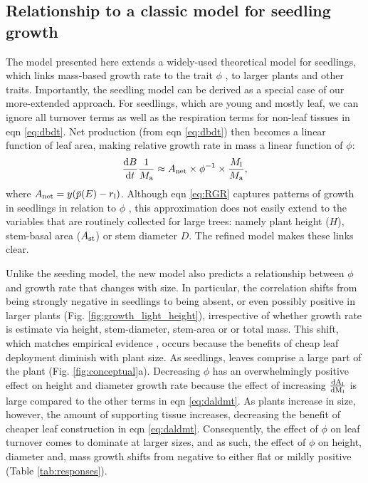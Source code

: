 \documentclass[a4paper,11pt]{article}
\begin{document}


\subsection{Relationship to a classic model for seedling growth}

The model presented here extends a widely-used theoretical model for seedlings, which links mass-based growth rate to the trait $\phi$ \citep{Lambers-1992, Wright-2000}, to larger plants and other traits. Importantly, the seedling model can be derived as a special case of our more-extended approach. For seedlings, which are young and mostly leaf, we can ignore all turnover terms as well as the respiration terms for non-leaf tissues in eqn \ref{eq:dbdt}. Net production (from eqn \ref{eq:dbdt}) then becomes a linear function of leaf area, making relative growth rate in mass a linear function of $\phi$:
\begin{equation}\label{eq:RGR}
\frac{{\rm d}B}{{\rm d}t}\frac{1}{M_{\rm a}}  \approx A_\textrm{net} \times \phi^{-1} \times \frac{M_{\rm l}}{M_{\rm a}}, \end{equation}
where $A_\textrm{net} = y(\bar{p}(E) - r_{\rm l})$. Although eqn \ref{eq:RGR} captures patterns of growth in seedlings in relation to $\phi$ \citep{Wright-2000}, this approximation does not easily extend to the variables that are routinely collected for large trees: namely plant height ($H$), stem-basal area ($A_{\rm st}$) or stem diameter $D$. The refined model makes these links clear.

Unlike the seeding model, the new model also predicts a relationship between $\phi$ and growth rate that changes with size. In particular, the correlation shifts from being strongly negative in seedlings to being absent, or even possibly positive in larger plants (Fig. \ref{fig:growth_light_height}), irrespective of whether growth rate is estimate via height, stem-diameter, stem-area or or total mass. This shift, which matches empirical evidence \citep{Poorter-2008, Wright-2010, Herault-2011, Paine-2015, Gibert-2016}, occurs because the benefits of cheap leaf deployment diminish with plant size. As seedlings, leaves comprise a large part of the plant (Fig. \ref{fig:conceptual}a). Decreasing $\phi$ has an overwhelmingly positive effect on height and diameter growth rate because the effect of increasing $\frac{\rm{d} A_{\rm l}}{\rm{d} M_{\rm l}}$ is large compared to the other terms in eqn \ref{eq:daldmt}. As plants increase in size, however, the amount of supporting tissue increases, decreasing the benefit of cheaper leaf construction in eqn \ref{eq:daldmt}. Consequently, the effect of $\phi$ on leaf turnover comes to dominate at larger sizes, and as such, the effect of $\phi$ on height, diameter and, mass growth shifts from negative to either flat or mildly positive  (Table \ref{tab:responses}).
\end{document}
